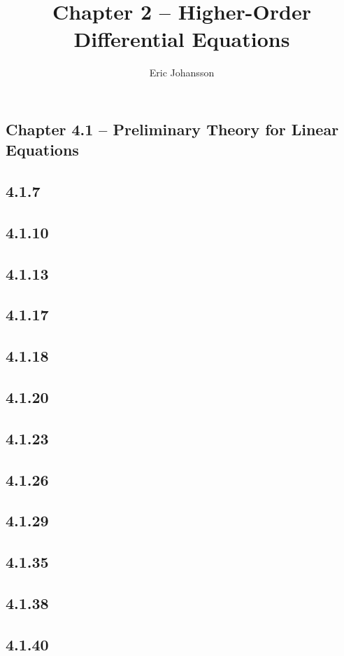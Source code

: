 \documentclass{article}
\title{Chapter 2 -- Higher-Order Differential Equations}
\author{Eric Johansson}
\begin{document}
\maketitle
\tableofcontents
\newpage

\subsection{Chapter 4.1 -- Preliminary Theory for Linear Equations }


\subsection{4.1.7}
\subsection{4.1.10}
\subsection{4.1.13}
\subsection{4.1.17}
\subsection{4.1.18}
\subsection{4.1.20}
\subsection{4.1.23}
\subsection{4.1.26}
\subsection{4.1.29}
\subsection{4.1.35}
\subsection{4.1.38}
\subsection{4.1.40}
\end{document}
